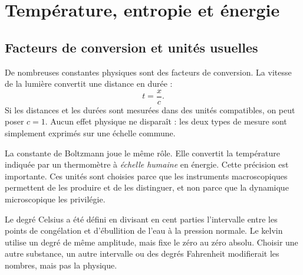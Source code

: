 \chapter{Température, entropie et énergie}


\section{Facteurs de conversion et unités usuelles}

De nombreuses constantes physiques sont des facteurs de conversion. La vitesse de la lumière convertit une distance en durée :
\begin{equation}
 t=\frac{x}{c}.
\end{equation}
Si les distances et les durées sont mesurées dans des unités compatibles, on peut poser \(c=1\). Aucun effet physique ne disparaît : les deux types de mesure sont simplement exprimés sur une échelle commune.

La constante de Boltzmann joue le même rôle. Elle convertit la température indiquée par un thermomètre à \emph{échelle humaine} en énergie. Cette précision est importante. Ces unités sont choisies parce que les instruments macroscopiques permettent de les produire et de les distinguer, et non parce que la dynamique microscopique les privilégie.

Le degré Celsius a été défini en divisant en cent parties l’intervalle entre les points de congélation et d’ébullition de l’eau à la pression normale. Le kelvin utilise un degré de même amplitude, mais fixe le zéro au zéro absolu. Choisir une autre substance, un autre intervalle ou des degrés Fahrenheit modifierait les nombres, mais pas la physique.

\begin{classroomqa}
\end{classroomqa}

